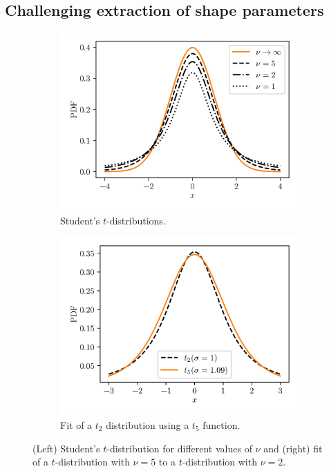 \documentclass{article}
\begin{document}
\subsection{Challenging extraction of shape parameters}
\begin{figure}[htbp]
    \centering
    \begin{subfigure}{.45\textwidth}
        \centering
        \includegraphics[width=\textwidth]{students.png}
        \caption{Student's $t$-distributions.}
        \label{fig:students}
    \end{subfigure}
    \begin{subfigure}{.45\textwidth}
        \centering
        \includegraphics[width=\textwidth]{dfit.png}
        \caption{Fit of a $t_2$ distribution using a $t_5$ function.}
        \label{fig:dfit}
    \end{subfigure}
    \caption{(Left) Student's $t$-distribution for different values of $\nu$ and (right) fit of a $t$-distribution with $\nu=5$ to a $t$-distribution with $\nu=2$.}
\end{figure}
\end{document}
